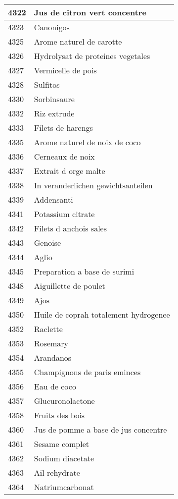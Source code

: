 \begin{longtable}{|l|l|}
4322 & Jus de citron vert concentre \\ \hline 
4323 & Canonigos \\ \hline 
4325 & Arome naturel de carotte \\ \hline 
4326 & Hydrolysat de proteines vegetales \\ \hline 
4327 & Vermicelle de pois \\ \hline 
4328 & Sulfitos \\ \hline 
4330 & Sorbinsaure \\ \hline 
4332 & Riz extrude \\ \hline 
4333 & Filets de harengs \\ \hline 
4335 & Arome naturel de noix de coco \\ \hline 
4336 & Cerneaux de noix \\ \hline 
4337 & Extrait d orge malte \\ \hline 
4338 & In veranderlichen gewichtsanteilen \\ \hline 
4339 & Addensanti \\ \hline 
4341 & Potassium citrate \\ \hline 
4342 & Filets d anchois sales \\ \hline 
4343 & Genoise \\ \hline 
4344 & Aglio \\ \hline 
4345 & Preparation a base de surimi \\ \hline 
4348 & Aiguillette de poulet \\ \hline 
4349 & Ajos \\ \hline 
4350 & Huile de coprah totalement hydrogenee \\ \hline 
4352 & Raclette \\ \hline 
4353 & Rosemary \\ \hline 
4354 & Arandanos \\ \hline 
4355 & Champignons de paris eminces \\ \hline 
4356 & Eau de coco \\ \hline 
4357 & Glucuronolactone \\ \hline 
4358 & Fruits des bois \\ \hline 
4360 & Jus de pomme a base de jus concentre \\ \hline 
4361 & Sesame complet \\ \hline 
4362 & Sodium diacetate \\ \hline 
4363 & Ail rehydrate \\ \hline 
4364 & Natriumcarbonat \\ \hline 

\end{longtable}
